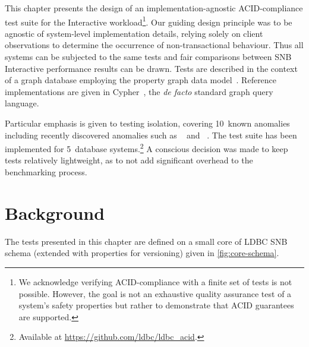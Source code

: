 This chapter presents the design of an implementation-agnostic ACID-compliance test suite for the Interactive workload\footnote{We acknowledge verifying ACID-compliance with a finite set of tests is not possible. However, the goal is not an exhaustive quality assurance test of a system's safety properties but rather to demonstrate that ACID guarantees are supported.}.
Our guiding design principle was to be agnostic of system-level implementation details, relying solely on client observations to determine the occurrence of non-transactional behaviour.
Thus all systems can be subjected to the same tests and fair comparisons between SNB Interactive performance results can be drawn.
Tests are described in the context of a graph database employing the property graph data model~\cite{DBLP:journals/csur/AnglesABHRV17}.
Reference implementations are given in Cypher~\cite{DBLP:conf/sigmod/FrancisGGLLMPRS18}, the \emph{de facto} standard graph query language.

Particular emphasis is given to testing isolation, covering 10~known anomalies including recently discovered anomalies such as ~\cite{DBLP:journals/pvldb/BailisDFGHS13} and ~\cite{DBLP:journals/tods/BailisFGHS16}.
The test suite has been implemented for 5~database systems.\footnote{Available at \url{https://github.com/ldbc/ldbc_acid}.}
A conscious decision was made to keep tests relatively lightweight, as to not add significant overhead to the benchmarking process.

\section{Background}

The tests presented in this chapter are defined on a small core of LDBC SNB schema (extended with properties for versioning) given in \autoref{fig:core-schema}.

